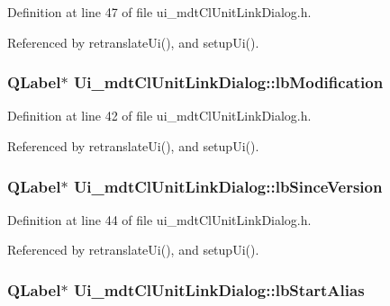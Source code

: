 Definition at line 47 of file ui\-\_\-mdt\-Cl\-Unit\-Link\-Dialog.\-h.



Referenced by retranslate\-Ui(), and setup\-Ui().

\hypertarget{class_ui__mdt_cl_unit_link_dialog_a890d42d154116f3a574ebf14daedb79c}{
\subsubsection[{lb\-Modification}]{\setlength{\rightskip}{0pt plus 5cm}Q\-Label$\ast$ Ui\-\_\-mdt\-Cl\-Unit\-Link\-Dialog\-::lb\-Modification}}\label{class_ui__mdt_cl_unit_link_dialog_a890d42d154116f3a574ebf14daedb79c}


Definition at line 42 of file ui\-\_\-mdt\-Cl\-Unit\-Link\-Dialog.\-h.



Referenced by retranslate\-Ui(), and setup\-Ui().

\hypertarget{class_ui__mdt_cl_unit_link_dialog_a461ab0e1ce3859dc45737e0103d8ff2f}{
\subsubsection[{lb\-Since\-Version}]{\setlength{\rightskip}{0pt plus 5cm}Q\-Label$\ast$ Ui\-\_\-mdt\-Cl\-Unit\-Link\-Dialog\-::lb\-Since\-Version}}\label{class_ui__mdt_cl_unit_link_dialog_a461ab0e1ce3859dc45737e0103d8ff2f}


Definition at line 44 of file ui\-\_\-mdt\-Cl\-Unit\-Link\-Dialog.\-h.



Referenced by retranslate\-Ui(), and setup\-Ui().

\hypertarget{class_ui__mdt_cl_unit_link_dialog_aaeb0e65da0b05b329fbb191c58b37fed}{
\subsubsection[{lb\-Start\-Alias}]{\setlength{\rightskip}{0pt plus 5cm}Q\-Label$\ast$ Ui\-\_\-mdt\-Cl\-Unit\-Link\-Dialog\-::lb\-Start\-Alias}}\label{class_ui__mdt_cl_unit_link_dialog_aaeb0e65da0b05b329fbb191c58b37fed}



